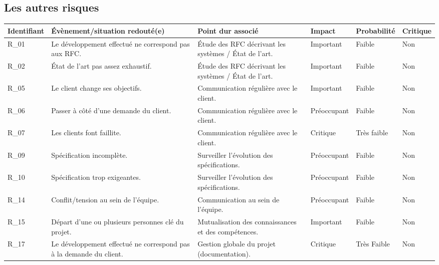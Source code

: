 \documentclass{../../res/univ-projet}
\begin{document}
\subsection{Les autres risques}
	\begin{flushleft}
		\begin{tabular}{| p{1.4cm} | p{4cm} | p{4cm} | p{1.7cm} | p{1.6cm} | p{1.2cm} |}
	  		\hline
	  		\cellcolor{gray}Identifiant & \cellcolor{lightgray}Évènement/situation redouté(e) & \cellcolor{lightgray}Point dur associé & \cellcolor{lightgray}Impact & \cellcolor{lightgray}Probabilité & \cellcolor{lightgray}Critique \\ \hline
	  
	  		R\_01 & Le développement effectué ne correspond pas aux RFC. 				& Étude des RFC décrivant les systèmes / État de l'art. 		& Important 	& Faible 		& \cellcolor{green} Non \\ \hline
	  		R\_02 & État de l'art pas assez exhaustif. 									& Étude des RFC décrivant les systèmes / État de l'art. 		& Important 	& Faible 		& \cellcolor{green} Non \\ \hline
	  		R\_05 & Le client change ses objectifs. 									& Communication régulière avec le client. 						& Important 	& Faible 		& \cellcolor{green} Non\\ \hline
	  		R\_06 & Passer à côté d'une demande du client. 								& Communication régulière avec le client. 						& Préoccupant	& Faible 		& \cellcolor{green} Non \\ \hline
	  		R\_07 & Les clients font faillite. 											& Communication régulière avec le client. 						& Critique 		& Très faible 	& \cellcolor{green} Non\\ \hline
	  		R\_09 & Spécification incomplète. 											& Surveiller l'évolution des spécifications. 					& Préoccupant	& Faible 		& \cellcolor{green} Non\\ \hline
	  		R\_10 & Spécification trop exigeantes.										& Surveiller l'évolution des spécifications.					& Préoccupant	& Faible 		& \cellcolor{green} Non\\ \hline
	  		R\_14 & Conflit/tension au sein de l'équipe. 								& Communication au sein de l'équipe. 							& Préoccupant	& Faible 		& \cellcolor{green} Non\\ \hline
	  		R\_15 & Départ d'une ou plusieurs personnes clé du projet. 					& Mutualisation des connaissances et des compétences. 			& Important	 	& Faible 		& \cellcolor{green} Non\\ \hline
	  		R\_17 & Le développement effectué ne correspond pas à la demande du client. & Gestion globale du projet (documentation).					& Critique		& Très Faible	& \cellcolor{green} Non\\ \hline

\end{tabular}
\end{flushleft}
\end{document}
